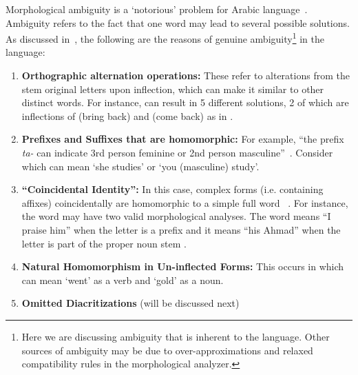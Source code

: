 \documentclass[a4,12pt]{report}
\newcommand{\noVocRL}[1]{\transtrue\novocalize\RL{#1}\vocalize}
\begin{document}
	Morphological ambiguity is a `notorious' problem for Arabic language~\cite{Kiraz:98}.
	Ambiguity refers to the fact that one word may lead to several possible solutions.
	As discussed in~\cite{Attia:08a}, the following are the reasons of genuine ambiguity\footnote{
	Here we are discussing ambiguity that is inherent to the language. Other sources of ambiguity
	may be due to over-approximations and relaxed compatibility rules in the morphological analyzer.} 
	in the language:
	\begin{enumerate}
		\item \textbf{Orthographic alternation operations:} These refer to alterations from the stem
			original letters upon inflection, which can make it similar to other distinct words.
			For instance, \noVocRL{ya`id} can result in 5 different solutions, 2 of which are
			inflections of  (bring back) and  (come back) as in .
			~\cite{Attia:08a}
		\item \textbf{Prefixes and Suffixes that are homomorphic:} For example, 
			``the prefix {\em ta-} can indicate 3rd person feminine or 2nd person masculine''~\cite{Attia:08a}.
			Consider \noVocRL{tadros} which can mean `she studies' or `you (masculine) study'.
		\item \textbf{``Coincidental Identity'':} In this case, complex forms (i.e. containing affixes) coincidentally
			are homomorphic to a simple full word ~\cite{Kamir:02}. 
			\vocalize 
			For instance, the word  may have two valid morphological analyses. 
			The word means ``I praise him'' when the letter  is a prefix and  it means
			``his Ahmad'' when the letter  is part of the proper noun stem .
		\item \textbf{Natural Homomorphism in Un-inflected Forms:} This occurs in \noVocRL{_dahaba} which can mean
			`went' as a verb and `gold' as a noun.~\cite{Attia:08a}
		\item \textbf{Omitted Diacritizations} (will be discussed next)
	\end{enumerate}
	
\end{document}
